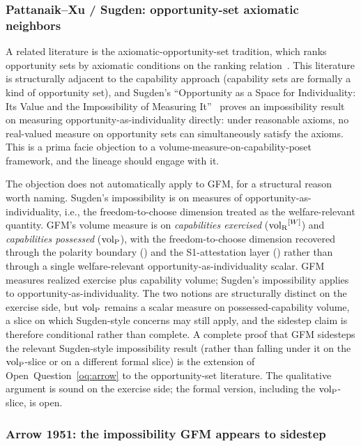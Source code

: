 \subsubsection{Pattanaik--Xu / Sugden: opportunity-set axiomatic neighbors}

A related literature is the axiomatic-opportunity-set tradition,
which ranks opportunity sets by axiomatic conditions on the
ranking relation~\citep{pattanaik2000ranking}.  This literature
is structurally adjacent to the capability approach (capability
sets are formally a kind of opportunity set), and Sugden's
``Opportunity as a Space for Individuality: Its Value and the
Impossibility of Measuring It''~\citep{sugden2003opportunity}
proves an impossibility result on measuring
opportunity-as-individuality directly: under reasonable axioms,
no real-valued measure on opportunity sets can simultaneously
satisfy the axioms.  This is a prima facie objection to a
volume-measure-on-capability-poset framework, and the lineage
should engage with it.

The objection does not automatically apply to GFM, for a
structural reason worth naming.  Sugden's impossibility is on
measures of opportunity-as-individuality, i.e., the
freedom-to-choose dimension treated as the welfare-relevant
quantity.  GFM's
volume measure is on \emph{capabilities exercised}
(${\operatorname{vol}_{\mathrm{R}}}^{[W]}$) and \emph{capabilities possessed} (${\operatorname{vol}_{\mathrm{P}}}$), with
the freedom-to-choose dimension recovered through the polarity
boundary (\citep[Definition~3]{lasser2026paper8b}) and the
S1-attestation layer (\citep[Remark~18]{lasser2026paper8a})
rather than through a single welfare-relevant
opportunity-as-individuality scalar.  GFM measures realized
exercise plus capability volume; Sugden's impossibility applies
to opportunity-as-individuality.  The two notions are
structurally distinct on the exercise side, but ${\operatorname{vol}_{\mathrm{P}}}$ remains
a scalar measure on possessed-capability volume, a slice on
which Sugden-style concerns may still apply, and the
sidestep claim is therefore conditional rather than complete.
A complete proof that GFM sidesteps the relevant Sugden-style
impossibility result (rather than falling under it on the
${\operatorname{vol}_{\mathrm{P}}}$-slice or on a different formal slice) is the extension
of Open~Question~\ref{oq:arrow} to the opportunity-set
literature.  The qualitative argument is sound on the exercise
side; the formal version, including the ${\operatorname{vol}_{\mathrm{P}}}$-slice, is
open.

\subsubsection{Arrow 1951: the impossibility GFM appears to sidestep}

